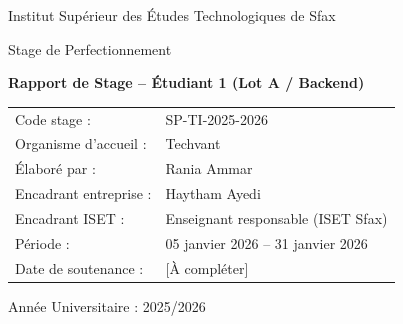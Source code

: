 \begin{titlepage}
\centering
{\Large Institut Supérieur des Études Technologiques de Sfax\par}
\vspace{0.8cm}
{\large Stage de Perfectionnement\par}
\vspace{1.2cm}
{\LARGE \textbf{Rapport de Stage -- Étudiant 1 (Lot A / Backend)}\par}
\vspace{1.2cm}
\begin{tabular}{ll}
Code stage : & SP-TI-2025-2026 \\
Organisme d'accueil : & Techvant \\
Élaboré par : & Rania Ammar \\
Encadrant entreprise : & Haytham Ayedi \\
Encadrant ISET : & Enseignant responsable (ISET Sfax) \\
Période : & 05 janvier 2026 -- 31 janvier 2026 \\
Date de soutenance : & [À compléter]
\end{tabular}
\vfill
Année Universitaire : 2025/2026
\end{titlepage}
